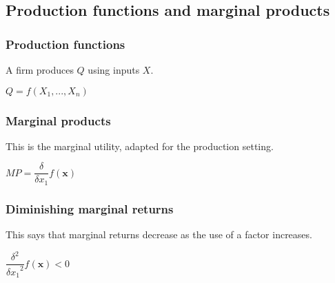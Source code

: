 
\subsection{Production functions and marginal products}

\subsubsection{Production functions}

A firm produces \(Q\) using inputs \(X\).

\(Q=f(X_1,...,X_n)\)

\subsubsection{Marginal products}

This is the marginal utility, adapted for the production setting.

\(MP=\dfrac{\delta }{\delta x_1}f(\mathbf x)\)

\subsubsection{Diminishing marginal returns}

This says that marginal returns decrease as the use of a factor increases.

\(\dfrac{\delta^2 }{{\delta x_1}^2}f(\mathbf x)<0\)

